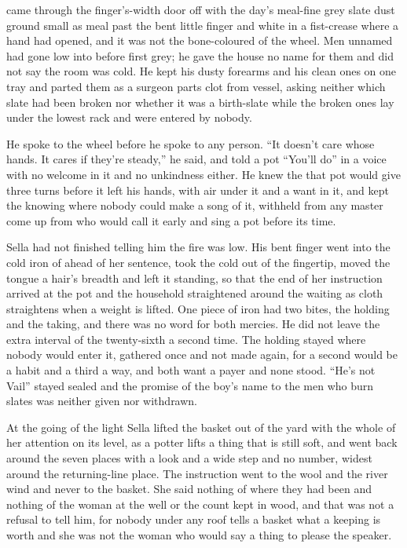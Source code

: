  came through the finger's-width door off  with the day's meal-fine grey slate dust ground small as meal past the bent little finger and white in a fist-crease where a hand had opened, and it was not the bone-coloured  of the wheel. Men unnamed had gone low into  before first grey; he gave the house no name for them and did not say the room was cold. He kept his dusty forearms and his clean ones on one tray and parted them as a surgeon parts clot from vessel, asking neither which slate had been broken nor whether it was a birth-slate while the broken ones lay under the lowest rack and were entered by nobody.

He spoke to the wheel before he spoke to any person. “It doesn't care whose hands. It cares if they're steady,” he said, and told a pot “You'll do” in a voice with no welcome in it and no unkindness either. He knew the  that pot would give three turns before it left his hands, with air under it and a want in it, and kept the knowing where nobody could make a song of it, withheld from any master come up from  who would call it early and sing a pot before its time.

Sella had not finished telling him the fire was low. His bent finger went into the cold iron of  ahead of her sentence, took the cold out of the fingertip, moved the tongue a hair's breadth and left it standing, so that the end of her instruction arrived at the pot and the household straightened around the waiting as cloth straightens when a weight is lifted. One piece of iron had two bites, the holding and the taking, and there was no  word for both mercies. He did not leave the extra interval of the twenty-sixth a second time. The holding stayed where nobody would enter it, gathered once and not made again, for a second would be a habit and a third a way, and both want a payer and none stood. “He's not Vail” stayed sealed and the promise of the boy's name to the men who burn slates was neither given nor withdrawn.

\scenebreak

At the going of the light Sella lifted the basket out of the yard with the whole of her attention on its level, as a potter lifts a thing that is still soft, and went back around the seven places with a look and a wide step and no number, widest around the returning-line place. The instruction went to the wool and the river wind and never to the basket. She said nothing of where they had been and nothing of the woman at the well or the count kept in wood, and that was not a refusal to tell him, for nobody under any roof tells a basket what a keeping is worth and she was not the woman who would say a thing to please the speaker.

